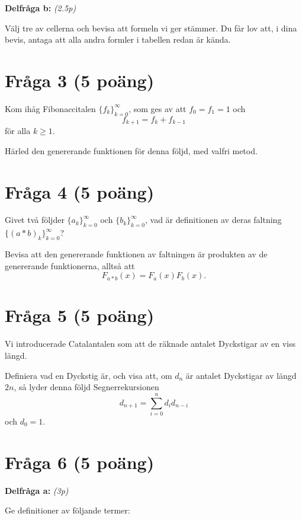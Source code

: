 \documentclass[nobib]{tufte-handout}
\begin{document}
\noindent\textbf{Delfråga b:} \emph{(2.5p)}

Välj tre av cellerna och bevisa att formeln vi ger stämmer. Du får lov att, i dina bevis, antaga att alla andra formler i tabellen redan är kända.

\section{Fråga 3 (5 poäng)} %

Kom ihåg Fibonaccitalen $\{f_k\}_{k=0}^\infty$, som ges av att $f_0 = f_1 = 1$ och
$$f_{k+1} = f_k + f_{k-1}$$
för alla $k \geq 1$.

Härled den genererande funktionen för denna följd, med valfri metod.

\section{Fråga 4 (5 poäng)} %

Givet två följder $\{a_k\}_{k=0}^\infty$ och $\{b_k\}_{k=0}^\infty$, vad är definitionen av deras faltning $\{(a*b)_k\}_{k=0}^\infty$?

Bevisa att den genererande funktionen av faltningen är produkten av de genererande funktionerna, alltså att
$$F_{a*b}(x) = F_a(x)F_b(x).$$

\section{Fråga 5 (5 poäng)} %

Vi introducerade Catalantalen som att de räknade antalet Dyckstigar av en viss längd.

Definiera vad en Dyckstig är, och visa att, om $d_n$ är antalet Dyckstigar av längd $2n$, så lyder denna följd Segnerrekursionen
$$d_{n+1} = \sum_{i=0}^{n} d_i d_{n-i}$$
och $d_0 = 1$.

\section{Fråga 6 (5 poäng)} %

\noindent\textbf{Delfråga a:} \emph{(3p)}

Ge definitioner av följande termer:
\end{document}
